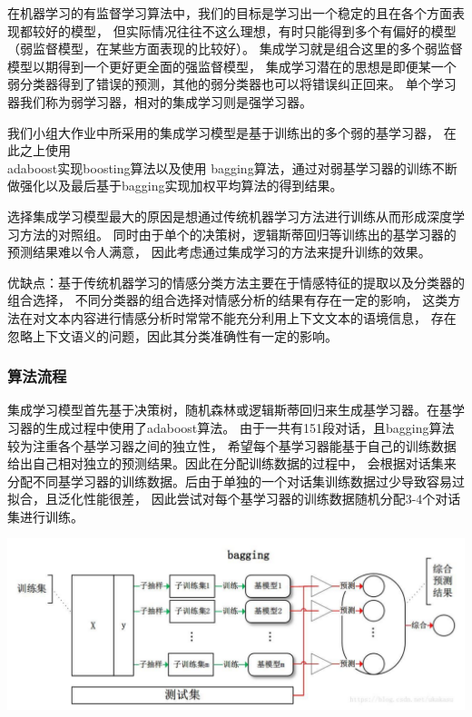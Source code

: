 \documentclass[11pt]{article}
\begin{document}
            在机器学习的有监督学习算法中，我们的目标是学习出一个稳定的且在各个方面表现都较好的模型，
            但实际情况往往不这么理想，有时只能得到多个有偏好的模型（弱监督模型，在某些方面表现的比较好）。
            集成学习就是组合这里的多个弱监督模型以期得到一个更好更全面的强监督模型，
            集成学习潜在的思想是即便某一个弱分类器得到了错误的预测，其他的弱分类器也可以将错误纠正回来。
            单个学习器我们称为弱学习器，相对的集成学习则是强学习器。
            
            我们小组大作业中所采用的集成学习模型是基于训练出的多个弱的基学习器，
            在此之上使用\\adaboost实现boosting算法以及使用
            bagging算法，通过对弱基学习器的训练不断做强化以及最后基于bagging实现加权平均算法的得到结果。
            
            选择集成学习模型最大的原因是想通过传统机器学习方法进行训练从而形成深度学习方法的对照组。
            同时由于单个的决策树，逻辑斯蒂回归等训练出的基学习器的预测结果难以令人满意，
            因此考虑通过集成学习的方法来提升训练的效果。
            
            优缺点：基于传统机器学习的情感分类方法主要在于情感特征的提取以及分类器的组合选择，
            不同分类器的组合选择对情感分析的结果有存在一定的影响，
            这类方法在对文本内容进行情感分析时常常不能充分利用上下文文本的语境信息，
            存在忽略上下文语义的问题，因此其分类准确性有一定的影响。


            \subsubsection{算法流程}
            集成学习模型首先基于决策树，随机森林或逻辑斯蒂回归来生成基学习器。在基学习器的生成过程中使用了adaboost算法。
            由于一共有151段对话，且bagging算法较为注重各个基学习器之间的独立性，
            希望每个基学习器能基于自己的训练数据给出自己相对独立的预测结果。因此在分配训练数据的过程中，
            会根据对话集来分配不同基学习器的训练数据。后由于单独的一个对话集训练数据过少导致容易过拟合，且泛化性能很差，
            因此尝试对每个基学习器的训练数据随机分配3-4个对话集进行训练。
            \begin{center}
                \includegraphics[scale = 1.1]{graph/tradition1.png}
            \end{center}
\end{document}
